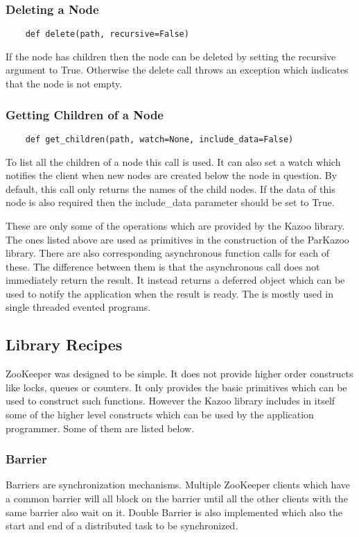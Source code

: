   \subsubsection{Deleting a Node}
  \begin{lstlisting}
    def delete(path, recursive=False)
  \end{lstlisting}
  If the node has children then the node can be deleted by setting the recursive argument to True. Otherwise the delete call throws an exception which indicates that the node is not empty.
  
  \subsubsection{Getting Children of a Node}
  \begin{lstlisting}
    def get_children(path, watch=None, include_data=False)
  \end{lstlisting}
  To list all the children of a node this call is used. It can also set a watch which notifies the client when new nodes are created below the node in question. By default, this call only returns the names of the child nodes. If the data of this node is also required then the include\_data parameter should be set to True.
  
  These are only some of the operations which are provided by the Kazoo library. The ones listed above are used as primitives in the construction of the ParKazoo library. There are also corresponding asynchronous function calls for each of these. The difference between them is that the asynchronous call does not immediately return the result. It instead returns a deferred object which can be used to notify the application when the result is ready. The is mostly used in single threaded evented programs.
  
\subsection{Library Recipes}
  ZooKeeper was designed to be simple. It does not provide higher order constructs like locks, queues or counters. It only provides the basic primitives which can be used to construct such functions. However the Kazoo library includes in itself some of the higher level constructs which can be used by the application programmer. Some of them are listed below.
  \subsubsection{Barrier}
    Barriers are synchronization mechanisms. Multiple ZooKeeper clients which have a common barrier will all block on the barrier until all the other clients with the same barrier also wait on it. Double Barrier is also implemented which also the start and end of a distributed task to be synchronized.
